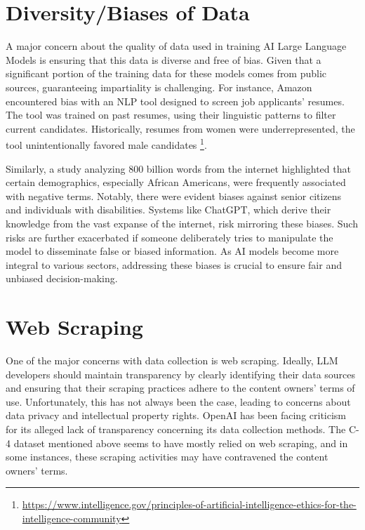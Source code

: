 \documentclass[
]{book}
\begin{document}
\hypertarget{diversitybiases-of-data}{%
\section{Diversity/Biases of Data}\label{diversitybiases-of-data}}

A major concern about the quality of data used in training AI Large Language Models is ensuring that this data is diverse and free of bias. Given that a significant portion of the training data for these models comes from public sources, guaranteeing impartiality is challenging. For instance, Amazon encountered bias with an NLP tool designed to screen job applicants' resumes. The tool was trained on past resumes, using their linguistic patterns to filter current candidates. Historically, resumes from women were underrepresented, the tool unintentionally favored male candidates \footnote{\url{https://www.intelligence.gov/principles-of-artificial-intelligence-ethics-for-the-intelligence-community}}.

Similarly, a study analyzing 800 billion words from the internet highlighted that certain demographics, especially African Americans, were frequently associated with negative terms. Notably, there were evident biases against senior citizens and individuals with disabilities. Systems like ChatGPT, which derive their knowledge from the vast expanse of the internet, risk mirroring these biases. Such risks are further exacerbated if someone deliberately tries to manipulate the model to disseminate false or biased information. As AI models become more integral to various sectors, addressing these biases is crucial to ensure fair and unbiased decision-making.

\hypertarget{web-scraping}{%
\section{Web Scraping}\label{web-scraping}}

One of the major concerns with data collection is web scraping. Ideally, LLM developers should maintain transparency by clearly identifying their data sources and ensuring that their scraping practices adhere to the content owners' terms of use. Unfortunately, this has not always been the case, leading to concerns about data privacy and intellectual property rights. OpenAI has been facing criticism for its alleged lack of transparency concerning its data collection methods. The C-4 dataset mentioned above seems to have mostly relied on web scraping, and in some instances, these scraping activities may have contravened the content owners' terms.
\end{document}
